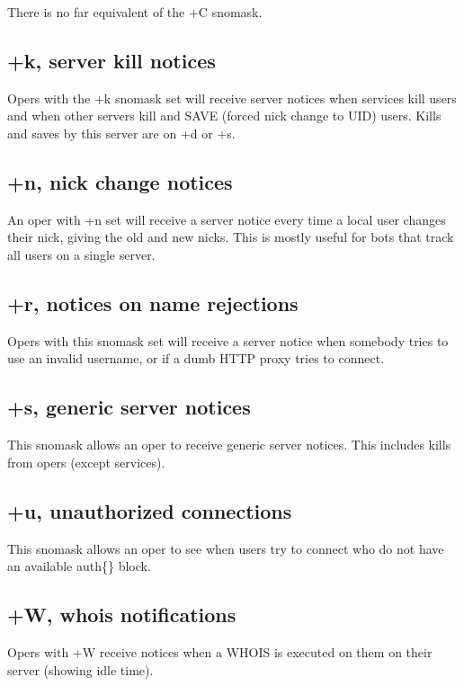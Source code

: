 	There is no far equivalent of the +C snomask.


\subsection{+k, server kill notices}

	Opers with the +k snomask set will receive server notices when services
	kill users and when other servers kill and SAVE (forced nick change to
	UID) users. Kills and saves by this server are on +d or +s.


\subsection{+n, nick change notices}

	An oper with +n set will receive a server notice every time a local
	user changes their nick, giving the old and new nicks. This is mostly
	useful for bots that track all users on a single server.


\subsection{+r, notices on name rejections}

	Opers with this snomask set will receive a server notice when somebody
	tries to use an invalid username, or if a dumb HTTP proxy tries to
	connect.


\subsection{+s, generic server notices}

	This snomask allows an oper to receive generic server notices. This
	includes kills from opers (except services).


\subsection{+u, unauthorized connections}

	This snomask allows an oper to see when users try to connect who do not
	have an available auth\{\} block.


\subsection{+W, whois notifications}

	Opers with +W receive notices when a WHOIS is executed on them on
	their server (showing idle time).
 


